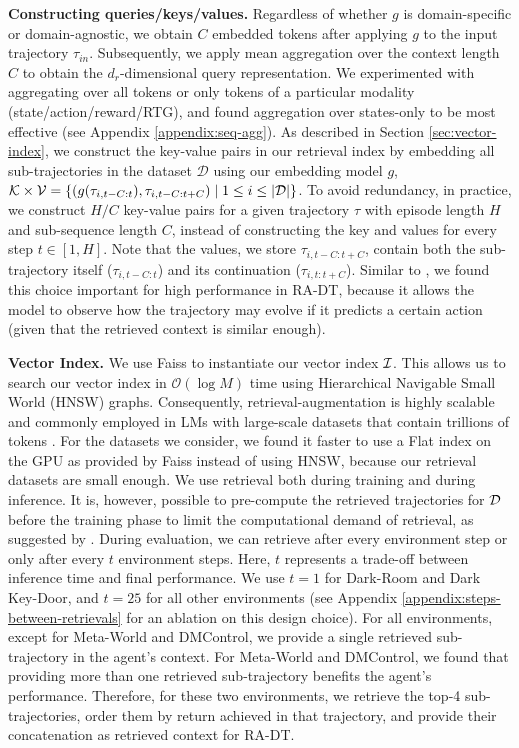 \textbf{Constructing queries/keys/values.}
Regardless of whether $g$ is domain-specific or domain-agnostic, we obtain $C$ embedded tokens after applying $g$ to the input trajectory $\tau_{in}$. 
Subsequently, we apply mean aggregation over the context length $C$ to obtain the $d_r$-dimensional query representation.
We experimented with aggregating over all tokens or only tokens of a particular modality (state/action/reward/RTG), and found aggregation over states-only to be most effective (see Appendix \ref{appendix:seq-agg}).
As described in Section \ref{sec:vector-index}, we construct the key-value pairs in our retrieval index by embedding all sub-trajectories in the dataset $\mathcal{D}$ using our embedding model $g$, $\mathcal{K} \times \mathcal{V} = \{(g(\tau_{i, t-C:t}), \tau_{i, t-C:t+C}) \mid 1 \leq i \leq |\mathcal{D}| \}$.
To avoid redundancy, in practice, we construct $H / C$ key-value pairs for a given trajectory $\tau$ with episode length $H$ and sub-sequence length $C$, instead of constructing the key and values for every step $t \in [1,H]$.
Note that the values, we store $\tau_{i, t-C:t+C}$, contain both the sub-trajectory itself ($\tau_{i, t-C:t}$) and its continuation ($\tau_{i, t:t+C}$).
Similar to \citet{Borgeaud:22}, we found this choice important for high performance in RA-DT, because it allows the model to observe how the trajectory may evolve if it predicts a certain action (given that the retrieved context is similar enough).

\textbf{Vector Index.} We use Faiss \citep{Johnson:2019,Douze:2024} to instantiate our vector index $\mathcal{I}$.
This allows us to search our vector index in $\mathcal{O}(\log M)$ time using Hierarchical Navigable Small World (HNSW) graphs. 
Consequently, retrieval-augmentation is highly scalable and commonly employed in LMs with large-scale datasets that contain trillions of tokens \citep{Borgeaud:22}.
For the datasets we consider, we found it faster to use a Flat index on the GPU as provided by Faiss instead of using HNSW, because our retrieval datasets are small enough.
We use retrieval both during training and during inference. 
It is, however, possible to pre-compute the retrieved trajectories for $\mathcal{D}$ before the training phase to limit the computational demand of retrieval, as suggested by \citet{Borgeaud:22}.
During evaluation, we can retrieve after every environment step or only after every $t$ environment steps. 
Here, $t$ represents a trade-off between inference time and final performance. 
We use $t=1$ for Dark-Room and Dark Key-Door, and $t=25$ for all other environments (see Appendix \ref{appendix:steps-between-retrievals} for an ablation on this design choice).
For all environments, except for Meta-World and DMControl, we provide a single retrieved sub-trajectory in the agent's context. 
For Meta-World and DMControl, we found that providing more than one retrieved sub-trajectory benefits the agent's performance.
Therefore, for these two environments, we retrieve the top-4 sub-trajectories, order them by return achieved in that trajectory, and provide their concatenation as retrieved context for RA-DT. 

